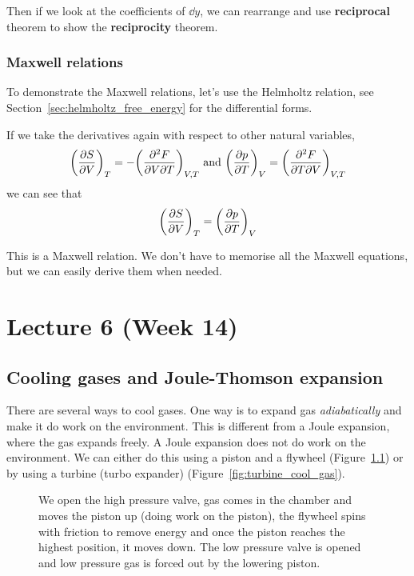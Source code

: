 \documentclass[12pt,chapterprefix=false,dvipsnames]{scrbook}
\theoremstyle{dotless}
\theoremstyle{definition}
\begin{document}
Then if we look at the coefficients of $\dd{y}$,
we can rearrange and use \textbf{reciprocal} theorem to show
the \textbf{reciprocity} theorem.

\subsection{Maxwell relations}%
\label{sub:maxwell_relations}

To demonstrate the Maxwell relations, let's use the Helmholtz
relation, see Section~\ref{sec:helmholtz_free_energy} for the
differential forms.

If we take the derivatives again with respect to other natural
variables,
\begin{equation}
	{\left(\pdv{S}{V}\right)}_T =
	-{\left(\pdv{F}{V}{T}\right)}_{V,T}\,\, \text{and}
	\,\,{\left(\pdv{p}{T}\right)}_V = {\left(\pdv{F}{T}{V}\right)}_{V,T}
\end{equation}
we can see that
\begin{equation}
	{\left(\pdv{S}{V}\right)}_T = {\left(\pdv{p}{T}\right)}_V
\end{equation}

This is a Maxwell relation. We don't have to memorise all the
Maxwell equations, but we can easily derive them when needed.

\chapter{Lecture 6 (Week 14)}%
\label{cha:lecture_6}

\section{Cooling gases and Joule-Thomson expansion}%
\label{sec:cooling_gases_joule_thomson_expansion}

There are several ways to cool gases. One way is to expand gas
\textit{adiabatically} and make it do work on the environment.
This is different from a Joule expansion, where the gas expands
freely. A Joule expansion does not do work on the environment.
We can either do this using a piston and a flywheel
(Figure~\ref{fig:piston_flywheel}) or by using a turbine (turbo
expander) (Figure~\ref{fig:turbine_cool_gas}).

\begin{figure}[htpb]
	\centering
	
	\caption{We open the high pressure valve, gas comes in the chamber and moves the piston up (doing work on
		the piston), the flywheel spins with friction to remove energy and once the
		piston reaches the highest position, it moves down. The low pressure valve is opened and low pressure
		gas is forced out by the lowering piston.}%
	\label{fig:piston_flywheel}
\end{figure}
\end{document}

